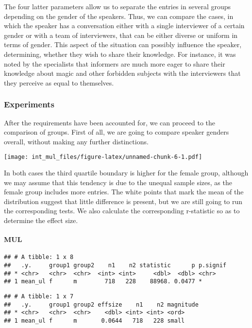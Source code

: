 \documentclass[
]{article}
\begin{document}
The four latter parameters allow us to separate the entries in several
groups depending on the gender of the speakers. Thus, we can compare the
cases, in which the speaker has a conversation either with a single
interviewer of a certain gender or with a team of interviewers, that can
be either diverse or uniform in terms of gender. This aspect of the
situation can possibly influence the speaker, determining, whether they
wish to share their knowledge. For instance, it was noted by the
specialists that informers are much more eager to share their knowledge
about magic and other forbidden subjects with the interviewers that they
perceive as equal to themselves.

\hypertarget{experiments}{%
\subsubsection{Experiments}\label{experiments}}

After the requirements have been accounted for, we can proceed to the
comparison of groups. First of all, we are going to compare speaker
genders overall, without making any further distinctions.

\texttt{[image: int\_mul\_files/figure-latex/unnamed-chunk-6-1.pdf]}

In both cases the third quartile boundary is higher for the female
group, although we may assume that this tendency is due to the unequal
sample sizes, as the female group includes more entries. The white
points that mark the mean of the distribution suggest that little
difference is present, but we are still going to run the corresponding
tests. We also calculate the corresponding r-statistic so as to
determine the effect size.

\hypertarget{mul}{%
\paragraph{MUL}\label{mul}}

\begin{verbatim}
## # A tibble: 1 x 8
##   .y.     group1 group2    n1    n2 statistic      p p.signif
## * <chr>   <chr>  <chr>  <int> <int>     <dbl>  <dbl> <chr>   
## 1 mean_ul f      m        718   228    88968. 0.0477 *
\end{verbatim}

\begin{verbatim}
## # A tibble: 1 x 7
##   .y.     group1 group2 effsize    n1    n2 magnitude
## * <chr>   <chr>  <chr>    <dbl> <int> <int> <ord>    
## 1 mean_ul f      m       0.0644   718   228 small
\end{verbatim}
\end{document}
